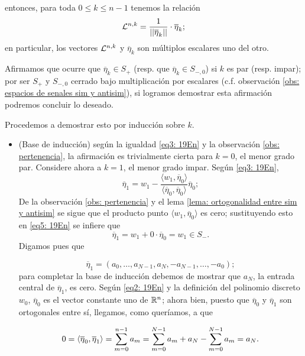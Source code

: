 \noindent
entonces, para toda $0 \leq k \leq n-1$ tenemos la relación 
\[
\mathcal{L}^{n,k}= \frac{1}{||\overline{\eta}_{k}||} \cdot \overline{\eta}_{k};
\]
en particular, los vectores $\mathcal{L}^{n,k}$ y 
$\overline{\eta}_{k}$ son múltiplos escalares uno del otro.

Afirmamos que ocurre que
$\overline{\eta}_{k} \in S_{+}$ (resp. que
$\overline{\eta}_{k} \in S_{-,0}$) si $k$ es par
(resp. impar); por ser $S_{+}$
y $S_{-,0}$ cerrado bajo multiplicación
por escalares (c.f. observación 
\ref{obs: espacios de senales sim y antisim}),
si logramos demostrar esta afirmación podremos concluir lo deseado.


Procedemos a demostrar esto por inducción sobre $k$.

\begin{itemize}

\item (Base de inducción) según la igualdad
\eqref{eq3: 19En} y la observación 
\ref{obs: pertenencia}, la afirmación 
es trivialmente cierta para $k=0$, el menor grado par.
Considere ahora a $k=1$, el menor grado impar. Según 
\eqref{eq3: 19En}, 
\begin{equation}
\label{eq5: 19En}
\overline{\eta}_{1}= w_{1}
- \frac{\langle w_{1}, \overline{\eta}_{0} \rangle}
{\langle \overline{\eta}_{0}, \overline{\eta}_{0} \rangle}\overline{\eta}_{0};
\end{equation}
De la observación 
\ref{obs: pertenencia} y el lema
\ref{lema: ortogonalidad entre sim y antisim} se sigue
que el producto punto $\langle w_{1}, \overline{\eta}_{0} \rangle$
es cero; sustituyendo esto en \eqref{eq5: 19En}
se infiere que 
\[
\overline{\eta}_{1} = w_{1} + 0 \cdot \overline{\eta}_{0}=
w_{1} \in S_{-}.
\]
Digamos pues que

\[
\overline{\eta}_{1} = 
(a_{0}, \ldots , a_{N-1}, a_{N}, -a_{N-1}, \ldots , -a_{0} );
\]
para completar la base de inducción debemos de mostrar
que $a_{N}$, la entrada central de $\overline{\eta}_{1}$,
es cero. Según \eqref{eq2: 19En} y
la definición del polinomio discreto $w_{0}$, 
$\overline{\eta}_{0}$ es el vector constante uno de $\mathbb{R}^{n}$;
ahora bien, puesto que $\overline{\eta}_{0}$
y $\overline{\eta}_{1}$
son ortogonales entre sí, llegamos, como queríamos, a que

\[
0 = \langle \overline{\eta}_{0}, \overline{\eta}_{1}\rangle
= \sum\limits_{m=0}^{n-1}a_{m} = 
\sum\limits_{m=0}^{N-1}a_{m} +a_{N} -
\sum\limits_{m=0}^{N-1}a_{m} = a_{N}.
\]




\end{itemize}
